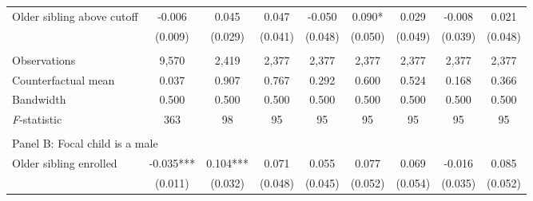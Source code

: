 \begin{table}[!htbp]
{{\begin{tabular}{lcccccccc}
Older sibling above cutoff&      -0.006   &       0.045   &       0.047   &      -0.050   &       0.090*  &       0.029   &      -0.008   &       0.021   \\
                    &     (0.009)   &     (0.029)   &     (0.041)   &     (0.048)   &     (0.050)   &     (0.049)   &     (0.039)   &     (0.048)   \\
                    &               &               &               &               &               &               &               &               \\
Observations        &       9,570   &       2,419   &       2,377   &       2,377   &       2,377   &       2,377   &       2,377   &       2,377   \\
Counterfactual mean &       0.037   &       0.907   &       0.767   &       0.292   &       0.600   &       0.524   &       0.168   &       0.366   \\
Bandwidth           &       0.500   &       0.500   &       0.500   &       0.500   &       0.500   &       0.500   &       0.500   &       0.500   \\
\textit{F}-statistic&         363   &          98   &          95   &          95   &          95   &          95   &          95   &          95   \\
 
&  &  &  & & & & & \\
\multicolumn{10}{l}{Panel B: Focal child is a male} \\
Older sibling enrolled&      -0.035***&       0.104***&       0.071   &       0.055   &       0.077   &       0.069   &      -0.016   &       0.085   \\
                    &     (0.011)   &     (0.032)   &     (0.048)   &     (0.045)   &     (0.052)   &     (0.054)   &     (0.035)   &     (0.052)   \\
 

\end{tabular}}}
\end{table}
